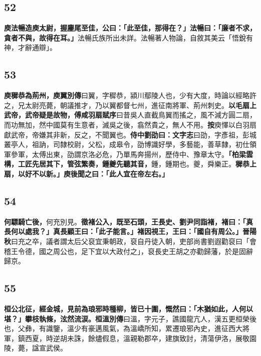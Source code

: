 \subsection*{52}

\textbf{庾法暢造庾太尉，握麈尾至佳，公曰：「此至佳，那得在？」法暢曰：「廉者不求，貪者不與，故得在耳。」}{\footnotesize 法暢氏族所出未詳。法暢著人物論，自敘其美云「悟銳有神，才辭通辯」。}

\subsection*{53}

\textbf{庾穉恭為荊州，}{\footnotesize \textbf{庾翼別傳}曰翼，字穉恭，潁川鄢陵人也，少有大度，時論以經略許之，兄太尉亮薨，朝議推才，乃以翼都督七州，進征南將軍、荊州刺史。}\textbf{以毛扇上武帝，武帝疑是故物，}{\footnotesize \textbf{傅咸羽扇賦序}曰昔吳人直截鳥翼而搖之，風不減方圓二扇，而功無加，然中國莫有生意者，滅吳之後，翕然貴之，無人不用。\textbf{按}庾懌以白羽扇獻武帝，帝嫌其非新，反之，不聞翼也。}\textbf{侍中劉劭曰：}{\footnotesize \textbf{文字志}曰劭，字彥祖，彭城叢亭人，祖訥，司隸校尉，父松，成皋令，劭博識好學，多藝能，善草隸，初仕領軍參軍，太傅出東，劭謂京洛必危，乃單馬奔揚州，歷侍中、豫章太守。}\textbf{「柏梁雲構，工匠先居其下，管弦繁奏，鍾夔先聽其音，}{\footnotesize 鍾，鍾期也。夔，舜樂正。}\textbf{穉恭上扇，以好不以新。」庾後聞之曰：「此人宜在帝左右。」}

\subsection*{54}

\textbf{何驃騎亡後，}{\footnotesize 何充別見。}\textbf{徵褚公入，既至石頭，王長史、劉尹同詣褚，褚曰：「真長何以處我？」真長顧王曰：「此子能言。」褚因視王，王曰：「國自有周公。」}{\footnotesize \textbf{晉陽秋}曰充之卒，議者謂太后父裒宜秉朝政，裒自丹徒入朝，吏部尚書劉遐勸裒曰「會稽王令德，國之周公也，足下宜以大政付之」，裒長史王胡之亦勸歸藩，於是固辭歸京。}

\subsection*{55}

\textbf{桓公北征，經金城，見前為琅邪時種柳，皆已十圍，慨然曰：「木猶如此，人何以堪？」攀枝執條，泫然流涙。}{\footnotesize \textbf{桓溫別傳}曰溫，字元子，譙國龍亢人，漢五更桓榮後也，父彝，有識鑒，溫少有豪邁風氣，為溫嶠所知，累遷琅邪內史，進征西大將軍，鎮西夏，時逆胡未誅，餘燼假息，溫親勒郡卒，建旗致討，清蕩伊洛，展敬園陵，薨，諡宣武侯。}

